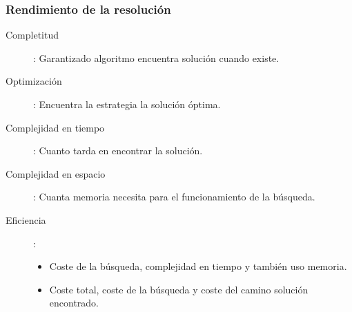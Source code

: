 \documentclass{beamer}
\begin{document}
\begin{frame} \frametitle{Rendimiento de la resolución} \footnotesize

\begin{description}
\item [Completitud]: Garantizado algoritmo encuentra solución cuando existe.
\item [Optimización]: Encuentra la estrategia la solución óptima.
\item [Complejidad en tiempo]: Cuanto tarda en encontrar la solución.
\item [Complejidad en espacio]: Cuanta memoria necesita para el funcionamiento de la búsqueda.

\item [Eficiencia]: 
	\begin{itemize}
		\item Coste de la búsqueda, complejidad en tiempo y también uso memoria. 
		\item Coste total, coste de la búsqueda y coste del camino solución encontrado.
		\end{itemize}
\end{description}


\end{frame} 







\end{document}
